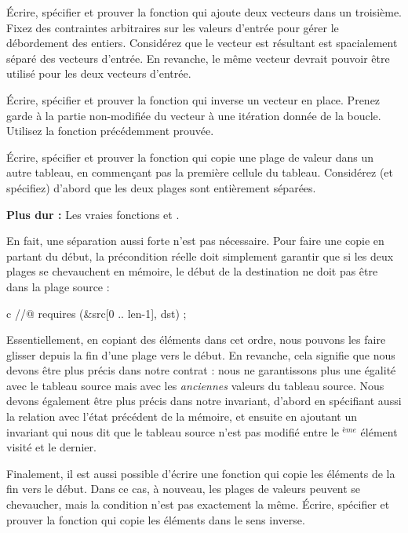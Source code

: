 Écrire, spécifier et prouver la fonction qui ajoute deux vecteurs dans un
troisième. Fixez des contraintes arbitraires sur les valeurs d'entrée pour 
gérer le débordement des entiers. Considérez que le vecteur est résultant est
spacialement séparé des vecteurs d'entrée. En revanche, le même vecteur devrait
pouvoir être utilisé pour les deux vecteurs d'entrée.





Écrire, spécifier et prouver la fonction qui inverse un vecteur en place. Prenez
garde à la partie non-modifiée du vecteur à une itération donnée de la boucle.
Utilisez la fonction  précédemment prouvée.






Écrire, spécifier et prouver la fonction  qui copie une plage
de valeur dans un autre tableau, en commençant pas la première cellule du
tableau. Considérez (et spécifiez) d'abord que les deux plages sont entièrement
séparées.





\textbf{Plus dur :} Les vraies fonctions  et
.


En fait, une séparation aussi forte n'est pas nécessaire. Pour faire une copie
en partant du début, la précondition réelle doit simplement garantir que si les
deux plages se chevauchent en mémoire, le début de la destination ne doit pas être
dans la plage source :


\begin{CodeBlock}{c}
//@ requires \separated(&src[0 .. len-1], dst) ;
\end{CodeBlock}
 

Essentiellement, en copiant des éléments dans cet ordre, nous pouvons les faire
glisser depuis la fin d'une plage vers le début. En revanche, cela signifie que
nous devons être plus précis dans notre contrat : nous ne garantissons plus une
égalité avec le tableau source mais avec les \emph{anciennes} valeurs du tableau
source. Nous devons également être plus précis dans notre invariant, d'abord en
spécifiant aussi la relation avec l'état précédent de la mémoire, et ensuite en
ajoutant un invariant qui nous dit que le tableau source n'est pas modifié entre
le $^{ème}$ élément visité et le dernier.


Finalement, il est aussi possible d'écrire une fonction qui copie les éléments de
la fin vers le début. Dans ce cas, à nouveau, les plages de valeurs peuvent se
chevaucher, mais la condition n'est pas exactement la même. Écrire, spécifier et
prouver la fonction  qui copie les éléments dans le
sens inverse.
